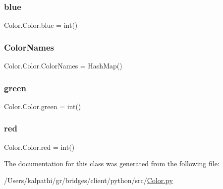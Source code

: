 \hypertarget{class_color_1_1_color_aae0c5d7ff0540d207fac048534b7e8bf}{}\label{class_color_1_1_color_aae0c5d7ff0540d207fac048534b7e8bf} 
\subsubsection{\texorpdfstring{blue}{blue}}
{\footnotesize\ttfamily Color.\+Color.\+blue = int()\hspace{0.3cm}{\ttfamily [static]}}

\hypertarget{class_color_1_1_color_ade3e7466d27087359ca123a8406c6f3f}{}\label{class_color_1_1_color_ade3e7466d27087359ca123a8406c6f3f} 
\subsubsection{\texorpdfstring{Color\+Names}{ColorNames}}
{\footnotesize\ttfamily Color.\+Color.\+Color\+Names = Hash\+Map()\hspace{0.3cm}{\ttfamily [static]}}

\hypertarget{class_color_1_1_color_a608f39a75b991c1ffda8bd91d9744d2b}{}\label{class_color_1_1_color_a608f39a75b991c1ffda8bd91d9744d2b} 
\subsubsection{\texorpdfstring{green}{green}}
{\footnotesize\ttfamily Color.\+Color.\+green = int()\hspace{0.3cm}{\ttfamily [static]}}

\hypertarget{class_color_1_1_color_ad6b9578f975c4f066a1e34dff6ac557a}{}\label{class_color_1_1_color_ad6b9578f975c4f066a1e34dff6ac557a} 
\subsubsection{\texorpdfstring{red}{red}}
{\footnotesize\ttfamily Color.\+Color.\+red = int()\hspace{0.3cm}{\ttfamily [static]}}



The documentation for this class was generated from the following file\+:\begin{DoxyCompactItemize}
\item 
/\+Users/kalpathi/gr/bridges/client/python/src/\hyperlink{_color_8py}{Color.\+py}\end{DoxyCompactItemize}
